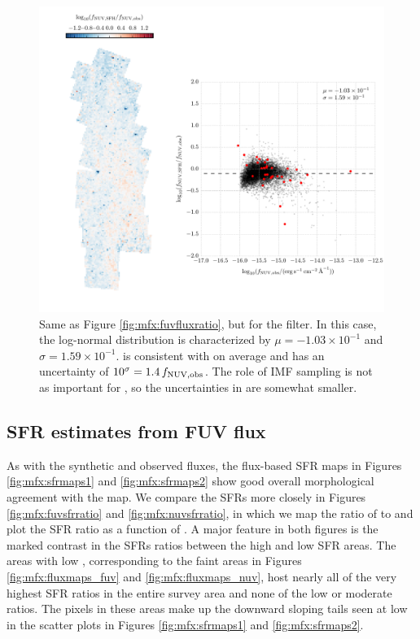 \begin{figure}
\centering
\includegraphics[width=\textwidth]{m31flux-figures/flux_nuv_sfh-vs-obs.pdf}
\caption[Ratio of the synthetic flux to the observed flux in the \nuv{}
filter.]{Same as Figure \ref{fig:mfx:fuvfluxratio}, but for the \nuv{} filter.
    In this case, the log-normal distribution is characterized by $\mu =
    -1.03\times 10^{-1}$ and $\sigma = 1.59\times 10^{-1}$. \fnuvsfh{} is
    consistent with \fnuvobs{} on average and has an uncertainty of $10^\sigma
    = 1.4\, f_{\mathrm{NUV},\mathrm{obs}}$. The role of IMF sampling is not as important for
    \fnuvobs{}, so the uncertainties in \fnuvsfh{} are somewhat smaller.
}
\label{fig:mfx:nuvfluxratio}
\end{figure}



\subsection{SFR estimates from FUV flux}

As with the synthetic and observed fluxes, the flux-based SFR maps in Figures
\ref{fig:mfx:sfrmaps1} and \ref{fig:mfx:sfrmaps2} show good overall
morphological agreement with the \sfroneh{} map. We compare the SFRs more
closely in Figures \ref{fig:mfx:fuvsfrratio} and \ref{fig:mfx:nuvsfrratio}, in
which we map the ratio of \sfrx{} to \sfroneh{} and plot the SFR ratio as a
function of \sfroneh{}. A major feature in both figures is the marked contrast
in the SFRs ratios between the high and low SFR areas. The areas with low
\sfroneh{}, corresponding to the faint areas in Figures
\ref{fig:mfx:fluxmaps_fuv} and \ref{fig:mfx:fluxmaps_nuv}, host nearly all of
the very highest SFR ratios in the entire survey area and none of the low or
moderate ratios. The pixels in these areas make up the downward sloping tails
seen at low \sfroneh{} in the scatter plots in Figures \ref{fig:mfx:sfrmaps1}
and \ref{fig:mfx:sfrmaps2}.


